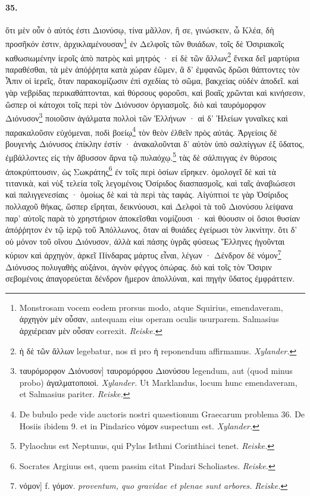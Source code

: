 \documentclass[a4paper, 11pt, oneside, polutonikogreek, german]{article}
\begin{document}
\paragraph{35.}
ὅτι μὲν οὖν ὁ αὐτός ἐστι Διονύσῳ, τίνα μᾶλλον, ἢ σε, γινώσκειν, ὦ Κλέα, δὴ προσῆκόν ἐστιν, ἀρχικλαμένουσαν\footnote{Monstrosam vocem eodem prorsus modo, atque Squirius, emendaveram, ἀρχηγὸν μὲν οὖσαν, antequam eius operam oculis usurparem. Salmasius ἀρχιέρειαν μὲν οὖσαν correxit. \emph{Reiske.}} ἐν Δελφοῖς τῶν θυιάδων, τοῖς δὲ Ὀσιριακοῖς καθωσιωμένην ἱεροῖς ἀπὸ πατρὸς καὶ μητρός · εἰ δὲ τῶν ἄλλων\footnote{ἡ δὲ τῶν ἄλλων legebatur, nos εἰ pro ἡ reponendum affirmamus. \emph{Xylander.}} ἕνεκα δεῖ μαρτύρια παραθέσθαι, τὰ μὲν ἀπόῤῥητα κατὰ χώραν ἐῶμεν, ἃ δ' ἐμφανῶς δρῶσι θάπτοντες τὸν Ἆπιν οἱ ἱερεῖς, ὅταν παρακομίζωσιν ἐπὶ σχεδίας τὸ σῶμα, βακχείας οὐδὲν ἀποδεῖ. καὶ γὰρ νεβρίδας περικαθάπτονται, καὶ θύρσους φοροῦσι, καὶ βοαῖς χρῶνται καὶ κινήσεσιν, ὥσπερ οἱ κάτοχοι τοῖς περὶ τὸν Διόνυσον ὀργιασμοῖς. διὸ καὶ ταυρόμορφον Διόνυσον\footnote{ταυρόμορφον Διόνυσον] ταυρομόρφου Διονύσου legendum, aut (quod minus probo) ἀγαλματοποιοὶ. \emph{Xylander.} Ut Marklandus, locum hunc emendaveram, et Salmasius pariter. \emph{Reiske.}} ποιοῦσιν ἀγάλματα πολλοὶ τῶν Ἑλλήνων · αἱ δ' Ἠλείων γυναῖκες καὶ παρακαλοῦσιν εὐχόμεναι, ποδὶ βοείῳ\footnote{De bubulo pede vide auctoris nostri quaestionum Graecarum problema 36. De Hosiis ibidem 9. et in Pindarico νόμον suspectum est. \emph{Xylander.}} τὸν θεὸν ἐλθεῖν πρὸς αὐτάς. Ἀργείοις δὲ βουγενὴς Διόνυσος ἐπίκλην ἐστίν · ἀνακαλοῦνται δ' αὐτὸν ὑπὸ σαλπίγγων ἐξ ὕδατος, ἐμβάλλοντες εἰς τὴν ἄβυσσον ἄρνα τῷ πυλαόχῳ.\footnote{Pylaochus est Neptunus, qui Pylas Isthmi Corinthiaci tenet. \emph{Reiske.}} τὰς δὲ σάλπιγγας ἐν θύρσοις ἀποκρύπτουσιν, ὡς Σωκράτης\footnote{Socrates Argiuus est, quem passim citat Pindari Scholiastes. \emph{Reiske.}} ἐν τοῖς περὶ ὁσίων εἴρηκεν. ὁμολογεῖ δὲ καὶ τὰ τιτανικὰ, καὶ νὺξ τελεία τοῖς λεγομένοις Ὀσίριδος διασπασμοῖς, καὶ ταῖς ἀναβιώσεσι καὶ παλιγγενεσίαις · ὁμοίως δὲ καὶ τὰ περὶ τὰς ταφάς. Αἰγύπτιοί τε γὰρ Ὀσίριδος πολλαχοῦ θήκας, ὥσπερ εἴρηται, δεικνύουσι, καὶ Δελφοὶ τὰ τοῦ Διονύσου λείψανα παρ' αὐτοῖς παρὰ τὸ χρηστήριον ἀποκεῖσθαι νομίζουσι · καὶ θύουσιν οἱ ὅσιοι θυσίαν ἀπόῤῥητον ἐν τῷ ἱερῷ τοῦ Ἀπόλλωνος, ὅταν αἱ θυιάδες ἐγείρωσι τὸν λικνίτην. ὅτι δ' οὐ μόνον τοῦ οἴνου Διόνυσον, ἀλλὰ καὶ πάσης ὑγρᾶς φύσεως Ἕλληνες ἡγοῦνται κύριον καὶ ἀρχηγὸν, ἀρκεῖ Πίνδαρας μάρτυς εἶναι, λέγων · Δένδρον δὲ νόμον\footnote{νόμον] f. γόμον. \emph{proventum, quo gravidae et plenae sunt arbores.} \emph{Reiske.}} Διόνυσος πολυγαθὴς αὐξάνοι, ἀγνὸν φέγγος ὀπώρας. διὸ καὶ τοῖς τὸν Ὄσιριν σεβομένοις ἀπαγορεύεται δένδρον ἥμερον ἀπολλύναι, καὶ πηγὴν ὕδατος ἐμφράττειν.
\end{document}
